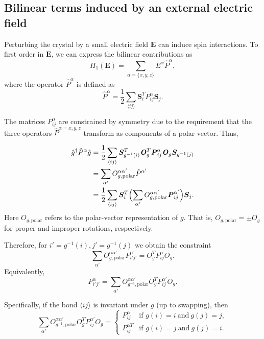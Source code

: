\documentclass[12pt, a4paper]{article}
\newcommand{\mat}[1]{\bm{\mathit{#1}}}
\begin{document}
\subsection{Bilinear terms induced by an external electric field}
Perturbing the crystal by a small electric field $\bm{E}$ can induce spin interactions. To first order in $\bm{E}$, we can express the bilinear contributions as
\begin{equation}
  H_1(\bm{E}) = \sum_{\alpha=\{x,y,z\}}E^{\alpha}\hat{P}^{\alpha},
\end{equation}
where the operator $\hat{P}^{\alpha}$ is defined as
\begin{equation}
   \hat{P}^{\alpha}= \frac{1}{2}\sum_{\langle ij\rangle}\bm{S}_i^T \mat{P}^{\alpha}_{ij}\bm{S}_j.
\end{equation}

The matrices $\mat{P}_{ij}^{\alpha}$ are constrained by symmetry due to the requirement that the three operators $\hat{P}^{\alpha=x,y,z}$ transform as components of a polar vector. Thus,

\begin{align}
  \hat{g}^{\dagger}\hat{P}^\alpha\hat{g} &= \frac{1}{2}\sum_{\langle ij\rangle}\bm{S}_{g^{-1}(i)}^T\mat{O}_g^T \mat{P}^{\alpha}_{ij}\mat{O}_g\bm{S}_{g^{-1}(j)}\\
   &= \sum_{\alpha'}O_{g,\textrm{polar}}^{\alpha\alpha'}\hat{P}^{\alpha'}\\
   &= \frac{1}{2}\sum_{\langle ij\rangle}\bm{S}_{i}^T \Bigl(\sum_{\alpha'}O_{g,\textrm{polar}}^{\alpha\alpha'}\mat{P}^{\alpha'}_{ij}\Bigr)\bm{S}_{j}.
\end{align}
Here $\mat{O}_{g,\textrm{polar}}$ refers to the polar-vector representation of $g$. That is, $\mat{O}_{g,\textrm{polar}}=\pm\mat{O}_{g}$ for proper and improper rotations, respectively.

Therefore, for $i'=g^{-1}(i),j'=g^{-1}(j)$ we obtain the constraint
\begin{equation}
  \sum_{\alpha'}O_{g,\textrm{polar}}^{\alpha\alpha'}\mat{P}_{i'j'}^{\alpha'}=\mat{O}_g^T \mat{P}^{\alpha}_{ij}\mat{O}_g.
\end{equation}
Equivalently,
\begin{equation}
  \mat{P}_{i'j'}^{\alpha}=\sum_{\alpha'}O_{g^{-1},\textrm{polar}}^{\alpha\alpha'}\mat{O}_g^T \mat{P}^{\alpha'}_{ij}\mat{O}_g.
\end{equation}

Specifically, if the bond $\langle ij\rangle$ is invariant under $g$ (up to swapping), then
\begin{equation}
 \sum_{\alpha'}O_{g^{-1},\textrm{polar}}^{\alpha\alpha'}\mat{O}_g^T \mat{P}^{\alpha'}_{ij}\mat{O}_g= \begin{cases}
    \mat{P}_{ij}^{\alpha}&\textrm{if }g(i)=i~\textrm{and}~g(j)=j,\\
    \mat{P}_{ij}^{\alpha T}&\textrm{if }g(i)=j~\textrm{and}~g(j)=i.
 \end{cases}
\end{equation}
\end{document}
